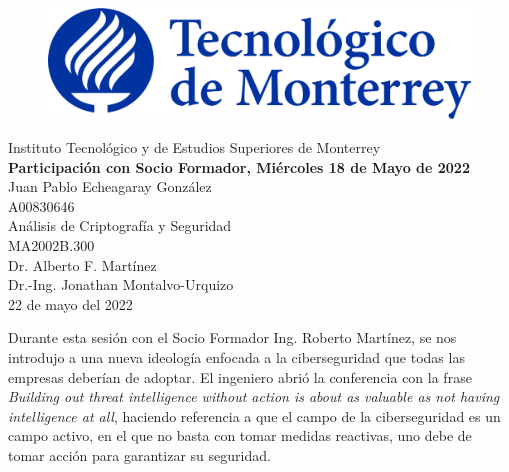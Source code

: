 \documentclass[12pt]{article}
\begin{document}
    \begin{titlepage}
        \begin{center}
            \begin{figure}
                \centering
                \includegraphics[scale=0.13]{../../logo_itesm.png}\\ %
            \end{figure}
        \vspace{5cm}
        \LARGE{Instituto Tecnológico y de Estudios Superiores de Monterrey}\\
        \fontsize{12}{14}\selectfont
        \vspace{1cm}
        \textbf{Participación con Socio Formador, Miércoles 18 de Mayo de 2022}\\ %
        \vspace{0.7cm}
        Juan Pablo Echeagaray González\\ %
        \vspace{0.2cm}
        A00830646\\ %
        \vspace{0.7cm}
        Análisis de Criptografía y Seguridad\\ %
        \vspace{0.2cm}
        MA2002B.300\\ %
        \vspace{0.2cm}
        Dr. Alberto F. Martínez \\ %
        \vspace{0.2cm}
        Dr.-Ing. Jonathan Montalvo-Urquizo \\
        \vspace{0.7cm}
        22 de mayo del 2022 \\ %
        \end{center}
    \end{titlepage}

    Durante esta sesión con el Socio Formador Ing. Roberto Martínez, se nos introdujo a una nueva ideología enfocada a la ciberseguridad que todas las empresas deberían de adoptar. El ingeniero abrió la conferencia con la frase \emph{Building out threat intelligence without action is about as valuable as not having intelligence at all}, haciendo referencia a que el campo de la ciberseguridad es un campo activo, en el que no basta con tomar medidas reactivas, uno debe de tomar acción para garantizar su seguridad.
\end{document}
